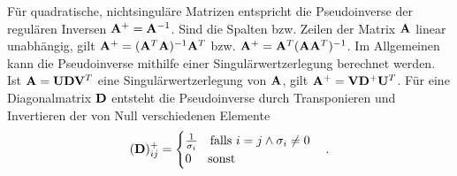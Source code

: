 Für quadratische, nichtsinguläre Matrizen entspricht die Pseudoinverse der regulären Inversen $\mathbf{A}^+ = \mathbf{A}^{-1}$. Sind die Spalten bzw. Zeilen der Matrix $\mathbf{A}$ linear unabhängig, gilt $\mathbf{A}^{+} = (\mathbf{A}^T \mathbf{A})^{-1} \mathbf{A}^T$ bzw. $\mathbf{A}^{+} = \mathbf{A}^T (\mathbf{A} \mathbf{A}^T)^{-1}$. Im Allgemeinen kann die Pseudoinverse mithilfe einer Singulärwertzerlegung berechnet werden. Ist $\mathbf{A} = \mathbf{U} \mathbf{D} \mathbf{V}^T$ eine Singulärwertzerlegung von $\mathbf{A}$, gilt $\mathbf{A}^+ = \mathbf{V} \mathbf{D}^+ \mathbf{U}^T$. Für eine Diagonalmatrix $\mathbf{D}$ entsteht die Pseudoinverse durch Transponieren und Invertieren der von Null verschiedenen Elemente
$$(\mathbf{D})_{ij}^{+} = \begin{cases} \frac{1}{\sigma_{i}} \quad \text{falls } i = j \wedge \sigma _{i} \neq 0\\ 0 \quad \text{ sonst}\end{cases}.$$
